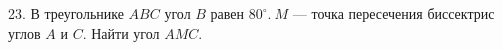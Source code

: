 23. В треугольнике $ABC$ угол $B$ равен $80^\circ.\ M$ --- точка пересечения биссектрис углов $A$ и $C.$ Найти угол $AMC.$\\
